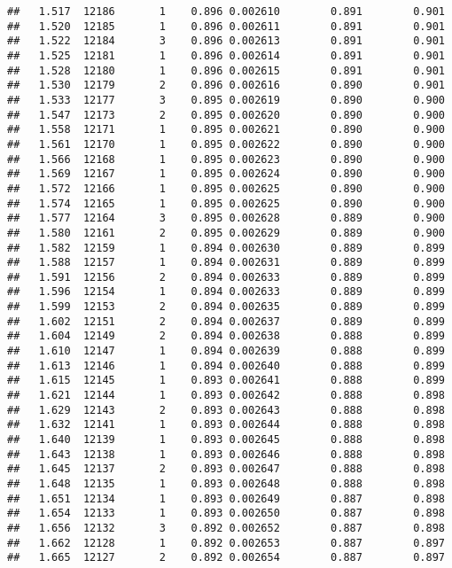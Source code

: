 \documentclass[
]{book}
\begin{document}
\begin{verbatim}
##   1.517  12186       1    0.896 0.002610        0.891        0.901
##   1.520  12185       1    0.896 0.002611        0.891        0.901
##   1.522  12184       3    0.896 0.002613        0.891        0.901
##   1.525  12181       1    0.896 0.002614        0.891        0.901
##   1.528  12180       1    0.896 0.002615        0.891        0.901
##   1.530  12179       2    0.896 0.002616        0.890        0.901
##   1.533  12177       3    0.895 0.002619        0.890        0.900
##   1.547  12173       2    0.895 0.002620        0.890        0.900
##   1.558  12171       1    0.895 0.002621        0.890        0.900
##   1.561  12170       1    0.895 0.002622        0.890        0.900
##   1.566  12168       1    0.895 0.002623        0.890        0.900
##   1.569  12167       1    0.895 0.002624        0.890        0.900
##   1.572  12166       1    0.895 0.002625        0.890        0.900
##   1.574  12165       1    0.895 0.002625        0.890        0.900
##   1.577  12164       3    0.895 0.002628        0.889        0.900
##   1.580  12161       2    0.895 0.002629        0.889        0.900
##   1.582  12159       1    0.894 0.002630        0.889        0.899
##   1.588  12157       1    0.894 0.002631        0.889        0.899
##   1.591  12156       2    0.894 0.002633        0.889        0.899
##   1.596  12154       1    0.894 0.002633        0.889        0.899
##   1.599  12153       2    0.894 0.002635        0.889        0.899
##   1.602  12151       2    0.894 0.002637        0.889        0.899
##   1.604  12149       2    0.894 0.002638        0.888        0.899
##   1.610  12147       1    0.894 0.002639        0.888        0.899
##   1.613  12146       1    0.894 0.002640        0.888        0.899
##   1.615  12145       1    0.893 0.002641        0.888        0.899
##   1.621  12144       1    0.893 0.002642        0.888        0.898
##   1.629  12143       2    0.893 0.002643        0.888        0.898
##   1.632  12141       1    0.893 0.002644        0.888        0.898
##   1.640  12139       1    0.893 0.002645        0.888        0.898
##   1.643  12138       1    0.893 0.002646        0.888        0.898
##   1.645  12137       2    0.893 0.002647        0.888        0.898
##   1.648  12135       1    0.893 0.002648        0.888        0.898
##   1.651  12134       1    0.893 0.002649        0.887        0.898
##   1.654  12133       1    0.893 0.002650        0.887        0.898
##   1.656  12132       3    0.892 0.002652        0.887        0.898
##   1.662  12128       1    0.892 0.002653        0.887        0.897
##   1.665  12127       2    0.892 0.002654        0.887        0.897

\end{verbatim}
\end{document}
